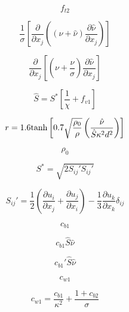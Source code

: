 

\begin{equation}
f_{t2}
\end{equation}

\begin{equation}
\frac{1}{\sigma}\left[\frac{\partial}{\partial x_j}\left(\left(\nu + \hat \nu \right)
     \frac{\partial \hat \nu}{\partial x_j}\right)\right]
\end{equation}

\begin{equation}
\frac{\partial}{\partial x_j}\left[\left(\nu + \frac{\hat \nu}{\sigma} \right) 
     \frac{\partial \hat \nu}{\partial x_j}\right]
\end{equation}

\begin{equation}
\hat S = S^* \left[ \frac{1}{\chi} + f_{v1} \right]
\end{equation}

\begin{equation}
r = 1.6 {\rm tanh} \left[ 0.7 \sqrt{\frac{\rho_0}{\rho}} \left( \frac{\hat \nu}{\hat S \kappa^2 d^2} \right) \right]
\end{equation}

\begin{equation}
\rho_0 
\end{equation}

\begin{equation}
S^* = \sqrt{2 S_{ij}' S_{ij}'}
\end{equation}

\begin{equation}
S_{ij}' = \frac{1}{2}\left( \frac{\partial u_i}{\partial x_j} + \frac{\partial u_j}{\partial x_i} \right)
   - \frac{1}{3} \frac{\partial u_k}{\partial x_k} \delta_{ij}
\end{equation}

\begin{equation}
c_{b1}
\end{equation}

\begin{equation}
c_{b1} \hat S \hat \nu
\end{equation}

\begin{equation}
c_{b1}' \hat S \hat \nu
\end{equation}

\begin{equation}
c_{w1}
\end{equation}

\begin{equation}
c_{w1} = \frac{c_{b1}}{\kappa^2} + \frac{1+c_{b2}}{\sigma}
\end{equation}

